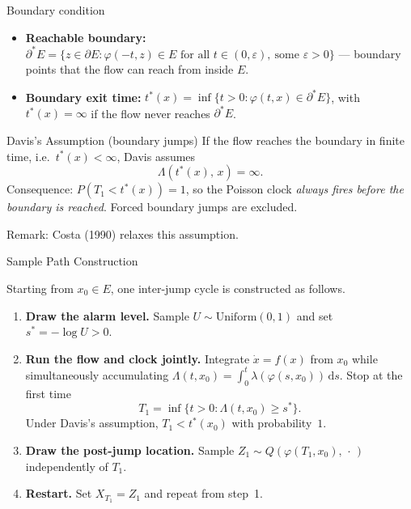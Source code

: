 \documentclass[aspectratio=169]{beamer}
\renewcommand{\phi}{\varphi}
\begin{document}
\begin{frame}{Boundary condition}

\begin{itemize}
  \item \textbf{Reachable boundary:} $\partial^* E = \{z \in \partial E : \phi(-t,z) \in E
        \text{ for all } t \in (0,\varepsilon),\ \text{some } \varepsilon > 0\}$ —
        boundary points that the flow can reach from inside $E$.
  \item \textbf{Boundary exit time:}
        $t^*(x) = \inf\{t > 0 : \phi(t,x) \in \partial^* E\}$,
        with $t^*(x) = \infty$ if the flow never reaches $\partial^* E$.
\end{itemize}

\vfill
  \begin{alertblock}{Davis's Assumption (boundary jumps)}
    If the flow reaches the boundary in finite time, i.e.\ $t^*(x) < \infty$,
    Davis assumes
    \[
      \Lambda(t^*(x),\,x) = \infty.
    \]
    Consequence: $P(T_1 < t^*(x)) = 1$, so the Poisson clock \emph{always fires
    before the boundary is reached}.  Forced boundary jumps are excluded.
  \end{alertblock}

  \vfill

  \alert{Remark:} Costa (1990) relaxes this assumption.
\end{frame}

\begin{frame}{Sample Path Construction}
 
  Starting from $x_0 \in E$, one inter-jump cycle is constructed as follows.
 
  \bigskip
  \begin{enumerate}
    \setlength\itemsep{8pt}
 
    \item \textbf{Draw the alarm level.}
          Sample $U \sim \mathrm{Uniform}(0,1)$ and set $s^* = -\log U > 0$.
 
    \item \textbf{Run the flow and clock jointly.}
          Integrate $\dot{x} = f(x)$ from $x_0$ while simultaneously
          accumulating $\Lambda(t,x_0) = \int_0^t \lambda(\phi(s,x_0))\,\mathrm{d}s$.
          Stop at the first time
          \[
            T_1 = \inf\bigl\{t > 0 : \Lambda(t,x_0) \geq s^*\bigr\}.
          \]
          Under Davis's assumption, $T_1 < t^*(x_0)$ with probability~$1$.
 
    \item \textbf{Draw the post-jump location.}
          Sample $Z_1 \sim Q\left(\phi(T_1,x_0),\,\cdot\,\right)$
          independently of $T_1$.
 
    \item \textbf{Restart.}
          Set $X_{T_1} = Z_1$ and repeat from step~1.
  \end{enumerate}
  
\end{frame}
\end{document}
